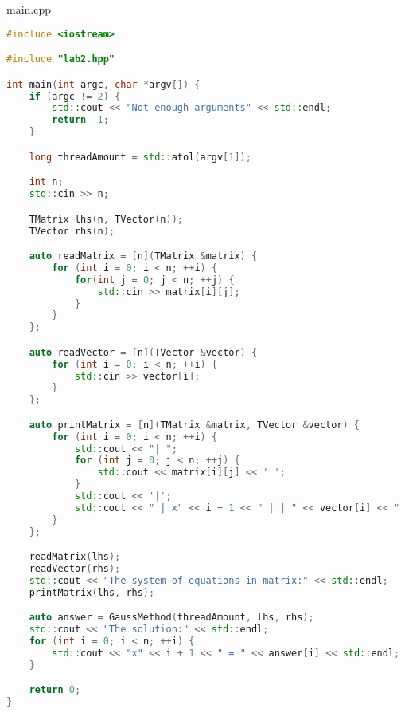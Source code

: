 \documentclass[a4paper, 12pt]{article}
\begin{document}
main.cpp
\begin{lstlisting}[language=C++]
#include <iostream>

#include "lab2.hpp"

int main(int argc, char *argv[]) {
    if (argc != 2) {
        std::cout << "Not enough arguments" << std::endl;
        return -1;
    }

    long threadAmount = std::atol(argv[1]);

    int n;
    std::cin >> n;

    TMatrix lhs(n, TVector(n));
    TVector rhs(n);

    auto readMatrix = [n](TMatrix &matrix) {
        for (int i = 0; i < n; ++i) {
            for(int j = 0; j < n; ++j) {
                std::cin >> matrix[i][j];
            }
        }
    };

    auto readVector = [n](TVector &vector) {
        for (int i = 0; i < n; ++i) {
            std::cin >> vector[i];
        }
    };

    auto printMatrix = [n](TMatrix &matrix, TVector &vector) {
        for (int i = 0; i < n; ++i) {
            std::cout << "| ";
            for (int j = 0; j < n; ++j) {
                std::cout << matrix[i][j] << ' ';
            }
            std::cout << '|';
            std::cout << " | x" << i + 1 << " | | " << vector[i] << " |" << std::endl;
        }
    };

    readMatrix(lhs);
    readVector(rhs);
    std::cout << "The system of equations in matrix:" << std::endl;
    printMatrix(lhs, rhs);

    auto answer = GaussMethod(threadAmount, lhs, rhs);
    std::cout << "The solution:" << std::endl;
    for (int i = 0; i < n; ++i) {
        std::cout << "x" << i + 1 << " = " << answer[i] << std::endl; 
    }

    return 0;
}
\end{lstlisting}

\newpage
\end{document}
